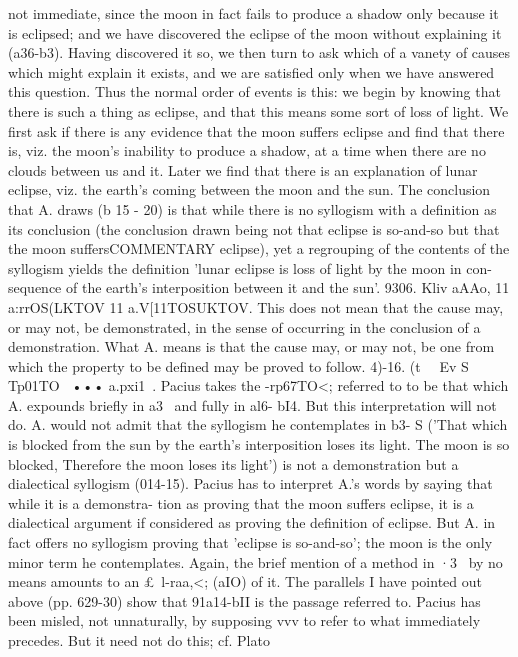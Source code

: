 {{{{{{{{{{{{{{{{{{{{{{{{{{{{{{{not immediate, since the moon in fact fails to produce a shadow
only because it is eclipsed; and we have discovered the eclipse
of the moon without explaining it (a36-b3). Having discovered
it so, we then turn to ask which of a vanety of causes which might
explain it exists, and we are satisfied only when we have answered
this question. Thus the normal order of events is this: we begin
by knowing that there is such a thing as eclipse, and that this
means some sort of loss of light. We first ask if there is any
evidence that the moon suffers eclipse and find that there is, viz.
the moon's inability to produce a shadow, at a time when there
are no clouds between us and it. Later we find that there is an
explanation of lunar eclipse, viz. the earth's coming between the
moon and the sun.
The conclusion that A. draws (b 15 - 20) is that while there is no
syllogism with a definition as its conclusion (the conclusion drawn
being not that eclipse is so-and-so but that the moon suffersCOMMENTARY
eclipse), yet a regrouping of the contents of the syllogism yields
the definition 'lunar eclipse is loss of light by the moon in con-
sequence of the earth's interposition between it and the sun'.
9306. Kliv
aAAo, 11 a:rrOS(LKTOV 11 a.V[11TOSUKTOV. This does
not mean that the cause may, or may not, be demonstrated, in
the sense of occurring in the conclusion of a demonstration. What
A. means is that the cause may, or may not, be one from which
the property to be defined may be proved to follow.
4)-16. (t~ ~Ev S~ Tp01TO~ ••• a.pxi1~. Pacius takes the -rp67TO<;
referred to to be that which A. expounds briefly in a3~ and fully
in al6- bI4. But this interpretation will not do. A. would not
admit that the syllogism he contemplates in b3- S ('That which is
blocked from the sun by the earth's interposition loses its light.
The moon is so blocked, Therefore the moon loses its light') is
not a demonstration but a dialectical syllogism (014-15). Pacius
has to interpret A.'s words by saying that while it is a demonstra-
tion as proving that the moon suffers eclipse, it is a dialectical
argument if considered as proving the definition of eclipse. But
A. in fact offers no syllogism proving that 'eclipse is so-and-so';
the moon is the only minor term he contemplates.
Again, the brief mention of a method in ·3~ by no means
amounts to an £~l-raa,<; (aIO) of it. The parallels I have pointed out
above (pp. 629-30) show that 91a14-bII is the passage referred to.
Pacius has been misled, not unnaturally, by supposing vvv to refer
to what immediately precedes. But it need not do this; cf. Plato
}}}}}}}}}}}}}}}}}}}}}}}}}}}}}}}
